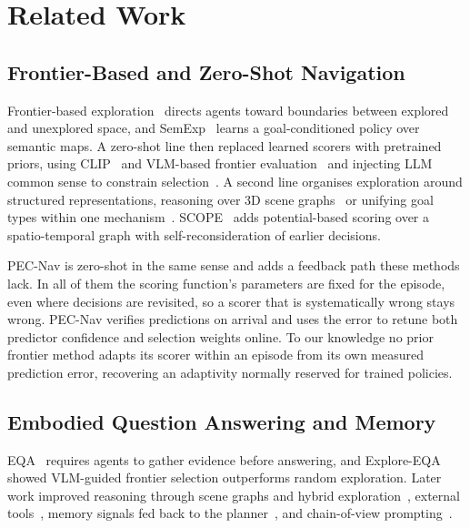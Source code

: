 \section{Related Work}

\subsection{Frontier-Based and Zero-Shot Navigation}
\label{sec:related-frontier}

Frontier-based exploration~\cite{yamauchi1997frontier} directs agents toward boundaries between explored and unexplored space, and SemExp~\cite{chaplot2020semexp} learns a goal-conditioned policy over semantic maps. A zero-shot line then replaced learned scorers with pretrained priors, using CLIP~\cite{radford2021clip} and VLM-based frontier evaluation~\cite{gadre2023cow,yokoyama2024vlfm} and injecting LLM common sense to constrain selection~\cite{zhou2023esc}. A second line organises exploration around structured representations, reasoning over 3D scene graphs~\cite{yin2024sgnav} or unifying goal types within one mechanism~\cite{yin2025unigoal}. SCOPE~\cite{wang2026scope} adds potential-based scoring over a spatio-temporal graph with self-reconsideration of earlier decisions.

PEC-Nav is zero-shot in the same sense and adds a feedback path these methods lack. In all of them the scoring function's parameters are fixed for the episode, even where decisions are revisited, so a scorer that is systematically wrong stays wrong. PEC-Nav verifies predictions on arrival and uses the error to retune both predictor confidence and selection weights online. To our knowledge no prior frontier method adapts its scorer within an episode from its own measured prediction error, recovering an adaptivity normally reserved for trained policies.

\subsection{Embodied Question Answering and Memory}

EQA~\cite{das2018eqa} requires agents to gather evidence before answering, and Explore-EQA~\cite{ren2024exploreeqa} showed VLM-guided frontier selection outperforms random exploration. Later work improved reasoning through scene graphs and hybrid exploration~\cite{saxena2025grapheqa,jiang2025fineeqa}, external tools~\cite{wang2025tooleqa}, memory signals fed back to the planner~\cite{zhai2025memorycentric}, and chain-of-view prompting~\cite{cov2026}.

